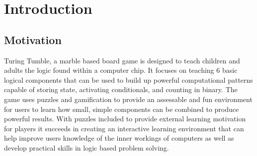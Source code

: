 \documentclass{l4proj}
\begin{document}
%
%
%
%
%
%
%
%
\chapter{Introduction}


\section{Motivation}
Turing Tumble, a marble based board game is designed to teach children and adults the logic found within a computer chip. It focuses on teaching 6 basic logical components that can be used to build up powerful computational patterns capable of storing state, activating conditionals, and counting in binary. The game uses puzzles and gamification to provide an assessable and fun environment for users to learn how small, simple components can be combined to produce powerful results. With puzzles included to provide external learning motivation for players it succeeds in creating an interactive learning environment that can help improve users knowledge of the inner workings of computers as well as develop practical skills in logic based problem solving. 
\end{document}
